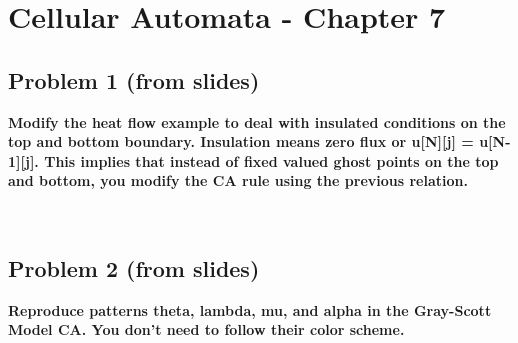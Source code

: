
\chapter{Cellular Automata - Chapter 7}

\section{Problem 1 (from slides)}
\textbf{
Modify the heat flow example to deal with insulated conditions on the top and bottom boundary. Insulation means zero flux or u[N][j] = u[N-1][j]. This implies that instead of fixed valued ghost points on the top and bottom, you modify the CA rule using the previous relation.
}

\hfill \\

\section{Problem 2 (from slides)}
\textbf{
Reproduce patterns theta, lambda, mu, and alpha in the Gray-Scott Model CA. You don't need to follow their color scheme.
}

\hfill \\

